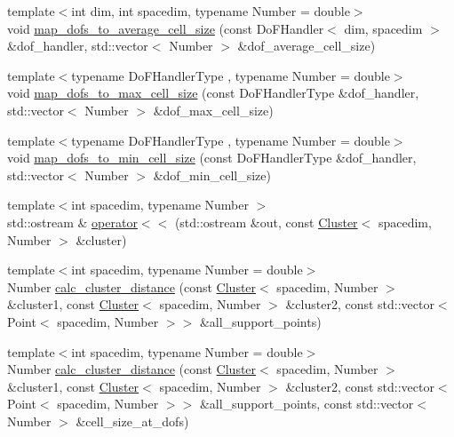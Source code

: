 \begin{DoxyCompactItemize}
\item 
{\footnotesize template$<$int dim, int spacedim, typename Number  = double$>$ }\\void \hyperlink{group__hierarchical__matrices_gaeba0b2d80f64d0bb5c1ad86ac31bbcda}{map\+\_\+dofs\+\_\+to\+\_\+average\+\_\+cell\+\_\+size} (const Do\+F\+Handler$<$ dim, spacedim $>$ \&dof\+\_\+handler, std\+::vector$<$ Number $>$ \&dof\+\_\+average\+\_\+cell\+\_\+size)
\item 
{\footnotesize template$<$typename Do\+F\+Handler\+Type , typename Number  = double$>$ }\\void \hyperlink{group__hierarchical__matrices_ga1eee708f9eb5b9e9a2d8031c60c5d315}{map\+\_\+dofs\+\_\+to\+\_\+max\+\_\+cell\+\_\+size} (const Do\+F\+Handler\+Type \&dof\+\_\+handler, std\+::vector$<$ Number $>$ \&dof\+\_\+max\+\_\+cell\+\_\+size)
\item 
{\footnotesize template$<$typename Do\+F\+Handler\+Type , typename Number  = double$>$ }\\void \hyperlink{group__hierarchical__matrices_ga0a1c7de8480c4e9b4a002818f8c19b52}{map\+\_\+dofs\+\_\+to\+\_\+min\+\_\+cell\+\_\+size} (const Do\+F\+Handler\+Type \&dof\+\_\+handler, std\+::vector$<$ Number $>$ \&dof\+\_\+min\+\_\+cell\+\_\+size)
\item 
{\footnotesize template$<$int spacedim, typename Number $>$ }\\std\+::ostream \& \hyperlink{group__hierarchical__matrices_ga79f6d9af30209ae20bdf81906360664a}{operator$<$$<$} (std\+::ostream \&out, const \hyperlink{classCluster}{Cluster}$<$ spacedim, Number $>$ \&cluster)
\item 
{\footnotesize template$<$int spacedim, typename Number  = double$>$ }\\Number \hyperlink{group__hierarchical__matrices_gab6b0a51fb1b117f29902d220df72420a}{calc\+\_\+cluster\+\_\+distance} (const \hyperlink{classCluster}{Cluster}$<$ spacedim, Number $>$ \&cluster1, const \hyperlink{classCluster}{Cluster}$<$ spacedim, Number $>$ \&cluster2, const std\+::vector$<$ Point$<$ spacedim, Number $>$$>$ \&all\+\_\+support\+\_\+points)
\item 
{\footnotesize template$<$int spacedim, typename Number  = double$>$ }\\Number \hyperlink{group__hierarchical__matrices_ga76ef8db7b1a8500eac8d807bf104cacb}{calc\+\_\+cluster\+\_\+distance} (const \hyperlink{classCluster}{Cluster}$<$ spacedim, Number $>$ \&cluster1, const \hyperlink{classCluster}{Cluster}$<$ spacedim, Number $>$ \&cluster2, const std\+::vector$<$ Point$<$ spacedim, Number $>$$>$ \&all\+\_\+support\+\_\+points, const std\+::vector$<$ Number $>$ \&cell\+\_\+size\+\_\+at\+\_\+dofs)

\end{DoxyCompactItemize}
